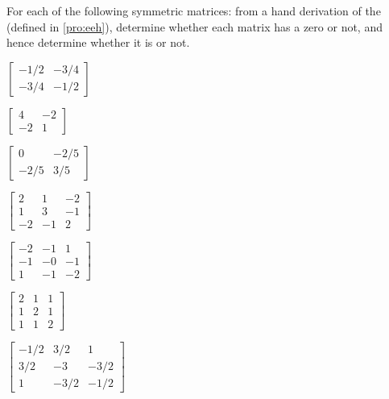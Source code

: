 \begin{exercise} \label{ex:} 
For each of the following symmetric matrices: from a hand derivation of the  (defined in \autoref{pro:eeh}), determine whether each matrix has a zero  or not, and hence determine whether it is  or not.
\begin{parts}
\item \(\begin{bmatrix} -1/2 & -3/4
\\ -3/4 & -1/2 \end{bmatrix}\)

\item \(\begin{bmatrix} 4 & -2
\\ -2 & 1 \end{bmatrix}\)

\item \(\begin{bmatrix} 0 & -2/5
\\ -2/5 & 3/5 \end{bmatrix}\)

\item \(\begin{bmatrix} 2 & 1 & -2
\\ 1 & 3 & -1
\\ -2 & -1 & 2 \end{bmatrix}\)

\item \(\begin{bmatrix} -2 & -1 & 1
\\ -1 & -0 & -1
\\ 1 & -1 & -2 \end{bmatrix}\)

\item \(\begin{bmatrix} 2 & 1 & 1
\\ 1 & 2 & 1
\\ 1 & 1 & 2 \end{bmatrix}\)

\item \(\begin{bmatrix} -1/2 & 3/2 & 1
\\ 3/2 & -3 & -3/2
\\ 1 & -3/2 & -1/2 \end{bmatrix}\)


\end{parts}
\end{exercise}
